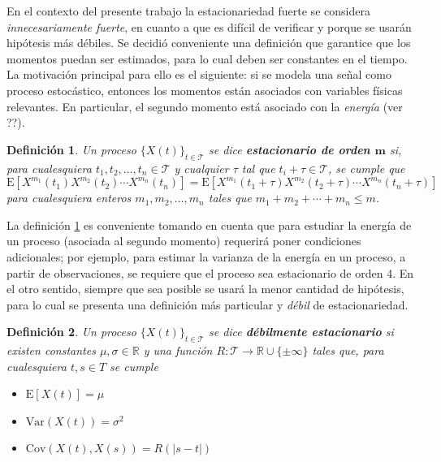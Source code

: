 \documentclass[12pt,letterpaper,draft]{book}
\newtheorem{definicion}{Definición}[chapter]
\newcommand{\R}{\mathbb{R}}
\newcommand{\E}[1]{\mathrm{E}\left[ #1 \right]}
\newcommand{\Var}[1]{\mathrm{Var}\left( #1 \right)}
\newcommand{\Cov}[1]{\mathrm{Cov}\left( #1 \right)}
\newcommand{\abso}[1]{\left| #1 \right|}
\newcommand{\xt}{$\{X(t)\}_{t\in \mathcal{T}}$ }
\begin{document}
En el contexto del presente trabajo la estacionariedad fuerte se considera \textit{innecesariamente fuerte}, en cuanto a que es difícil de verificar y porque se usarán hipótesis más débiles.
%
Se decidió conveniente una definición que garantice que los momentos puedan ser estimados, para lo cual deben ser constantes en el tiempo.
%
La motivación principal para ello es el siguiente: si se modela una señal como proceso estocástico, entonces los momentos están asociados con variables físicas relevantes. 
%
En particular, el segundo momento está asociado con la \textit{energía} (ver ??).

\begin{definicion}%
Un proceso \xt se dice \textbf{estacionario de orden $\boldsymbol{m}$} si, para cualesquiera $t_1, t_2, \dots, t_n \in \mathcal{T}$ y cualquier $\tau$ tal que $t_i + \tau \in \mathcal{T}$, se cumple que
\begin{equation*}
\E{X^{m_1}(t_1)X^{m_2}(t_2)\cdots X^{m_n}(t_n)} =
\E{X^{m_1}(t_1+\tau)X^{m_2}(t_2+\tau)\cdots X^{m_n}(t_n+\tau)}
\end{equation*}
para cualesquiera enteros $m_1, m_2, \dots, m_n$ tales que $m_1+m_2+\cdots+m_n \leq m$.
\label{est_m}
\end{definicion}

La definición \ref{est_m} es conveniente tomando en cuenta que para estudiar la energía de un proceso (asociada al segundo momento) requerirá poner condiciones adicionales; por ejemplo, para estimar la varianza de la energía en un proceso, a partir de observaciones, se requiere que el proceso sea estacionario de orden 4.
%
En el otro sentido, siempre que sea posible se usará la menor cantidad de hipótesis, para lo cual se presenta una definición más particular y \textit{débil} de estacionariedad.

\begin{definicion}%
Un proceso \xt se dice \textbf{débilmente estacionario} si existen constantes $\mu, \sigma \in \R$ y una función $R : \mathcal{T} \rightarrow \R \cup \{ \pm \infty \} $ tales que, para cualesquiera $t, s \in T$ se 
cumple
\begin{itemize}
\item $\E{X(t)} = \mu$
\item $\Var{X(t)} = \sigma^{2}$
\item $\Cov{X(t),X(s)} = R(\abso{s-t})$
\end{itemize}
\end{definicion}
\end{document}
